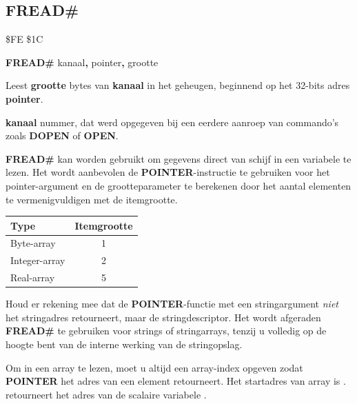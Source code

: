 \subsection{FREAD\#}
\begin{description}[leftmargin=2cm,style=nextline]
\item [Token:]    \$FE \$1C
\item [Formaat:]   {\bf FREAD\#} kanaal{\bf,} pointer{\bf,} grootte\item [Gebruik:]    Leest {\bf grootte} bytes van {\bf kanaal} in het geheugen, beginnend op het 32-bits adres {\bf pointer}.

                  {\bf kanaal} nummer, dat werd opgegeven bij een eerdere aanroep van commando's zoals {\bf DOPEN} of {\bf OPEN}.

                  {\bf FREAD\#} kan worden gebruikt om gegevens direct van schijf in een variabele te lezen. Het wordt aanbevolen de {\bf POINTER}-instructie te gebruiken voor het pointer-argument en de grootteparameter te berekenen door het aantal elementen te vermenigvuldigen met de itemgrootte.

                  \begin{center}
                  \label{freadtable}
                  \setlength{\tabcolsep}{1mm}
                  \begin{tabular}{|l|c|}
                  \hline
                  {\bf Type}     & {\bf Itemgrootte} \\
                  \hline
                  Byte-array &  1  \\                 Integer-array &  2  \\                  Real-array &  5  \\
                  \hline
                  \end{tabular}
                  \end{center}

\item [Opmerkingen:]  Houd er rekening mee dat de {\bf POINTER}-functie met een stringargument {\em niet} het stringadres retourneert, maar de stringdescriptor. Het wordt afgeraden {\bf FREAD\#} te gebruiken voor strings of stringarrays, tenzij u volledig op de hoogte bent van de interne werking van de stringopslag.

                  Om in een array te lezen, moet u altijd een array-index opgeven zodat {\bf POINTER} het adres van een element retourneert. Het startadres van array  is .  retourneert het adres van de scalaire variabele .


\end{description}
